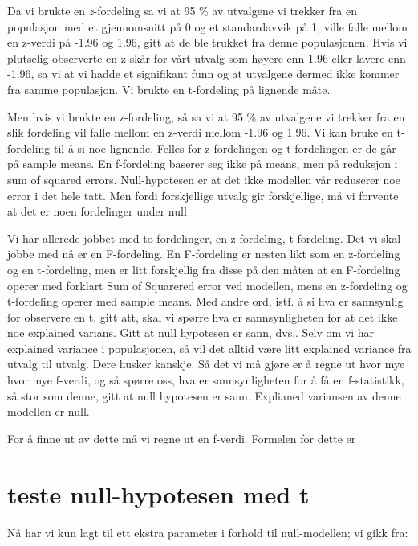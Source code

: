\documentclass[
]{book}
\begin{document}
Da vi brukte en \emph{z}-fordeling sa vi at 95 \% av utvalgene vi trekker fra en populasjon med et gjennomsnitt på 0 og et standardavvik på 1, ville falle mellom en z-verdi på -1.96 og 1.96, gitt at de ble trukket fra denne populasjonen. Hvis vi plutselig observerte en z-skår for vårt utvalg som høyere enn 1.96 eller lavere enn -1.96, sa vi at vi hadde et signifikant funn og at utvalgene dermed ikke kommer fra samme populasjon. Vi brukte en t-fordeling på lignende måte.

Men hvis vi brukte en z-fordeling, så sa vi at 95 \% av utvalgene vi trekker fra en slik fordeling vil falle mellom en z-verdi mellom -1.96 og 1.96. Vi kan bruke en t-fordeling til å si noe lignende. Felles for z-fordelingen og t-fordelingen er de går på sample means. En f-fordeling baserer seg ikke på means, men på reduksjon i sum of squared errors. Null-hypotesen er at det ikke modellen vår reduserer noe error i det hele tatt. Men fordi forskjellige utvalg gir forskjellige, må vi forvente at det er noen fordelinger under null

Vi har allerede jobbet med to fordelinger, en z-fordeling, t-fordeling. Det vi skal jobbe med nå er en F-fordeling. En F-fordeling er nesten likt som en z-fordeling og en t-fordeling, men er litt forskjellig fra disse på den måten at en F-fordeling operer med forklart Sum of Squarered error ved modellen, mens en z-fordeling og t-fordeling operer med sample means. Med andre ord, istf. å si hva er sannsynlig for observere en t, gitt att, skal vi spørre hva er sannsynligheten for at det ikke noe explained varians. Gitt at null hypotesen er sann, dvs.. Selv om vi har explained variance i populasjonen, så vil det alltid være litt explained variance fra utvalg til utvalg. Dere husker kanskje. Så det vi må gjøre er å regne ut hvor mye hvor mye f-verdi, og så spørre oss, hva er sannsynligheten for å få en f-statistikk, så stor som denne, gitt at null hypotesen er sann. Explianed variansen av denne modellen er null.

For å finne ut av dette må vi regne ut en f-verdi. Formelen for dette er

\hypertarget{teste-null-hypotesen-med-t}{%
\section{teste null-hypotesen med t}\label{teste-null-hypotesen-med-t}}

Nå har vi kun lagt til ett ekstra parameter i forhold til null-modellen; vi gikk fra:
\end{document}
